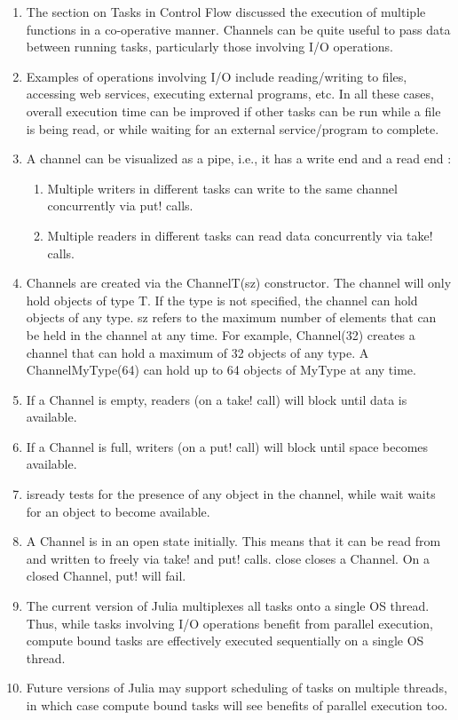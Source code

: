 \begin{enumerate}
	\item The section on Tasks in Control Flow discussed the execution of multiple functions in a co-operative manner. Channels can be quite useful to pass data between running tasks, particularly those involving I/O operations.
	
	\item Examples of operations involving I/O include reading/writing to files, accessing web services, executing external programs, etc. In all these cases, overall execution time can be improved if other tasks can be run while a file is being read, or while waiting for an external service/program to complete.
	
	\item A channel can be visualized as a pipe, i.e., it has a write end and a read end :
	\begin{enumerate}
		\item Multiple writers in different tasks can write to the same channel concurrently via put! calls.
		
		\item Multiple readers in different tasks can read data concurrently via take! calls.
	\end{enumerate}
	
	
	\item Channels are created via the Channel{T}(sz) constructor. The channel will only hold objects of type T. If the type is not specified, the channel can hold objects of any type. sz refers to the maximum number of elements that can be held in the channel at any time. For example, Channel(32) creates a channel that can hold a maximum of 32 objects of any type. A Channel{MyType}(64) can hold up to 64 objects of MyType at any time.
	
	\item If a Channel is empty, readers (on a take! call) will block until data is available.
	
	\item If a Channel is full, writers (on a put! call) will block until space becomes available.
	
	\item isready tests for the presence of any object in the channel, while wait waits for an object to become available.
	
	\item A Channel is in an open state initially. This means that it can be read from and written to freely via take! and put! calls. close closes a Channel. On a closed Channel, put! will fail.
	
	\item The current version of Julia multiplexes all tasks onto a single OS thread. Thus, while tasks involving I/O operations benefit from parallel execution, compute bound tasks are effectively executed sequentially on a single OS thread. 
	
	\item Future versions of Julia may support scheduling of tasks on multiple threads, in which case compute bound tasks will see benefits of parallel execution too.
	

	
\end{enumerate}

